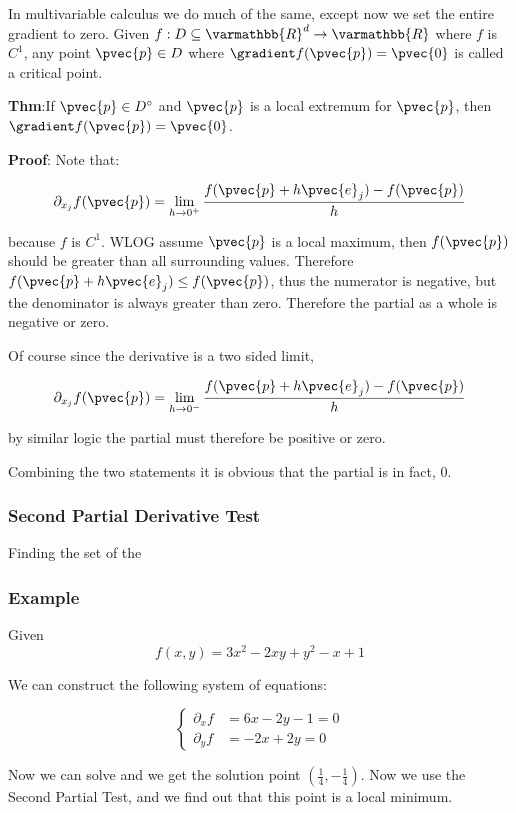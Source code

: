 \documentclass[11 pt, twoside]{article}
\begin{document}
In multivariable calculus we do much of the same, except now we set the entire
gradient to zero. Given $f: D \subseteq \varmathbb{R}^d \to \varmathbb{R}$ where
$f$ is $C^1$, any point $\pvec{p} \in D$ where $\gradient f(\pvec{p}) = \pvec{0}$
is called a critical point.

\textbf{Thm}:If $\pvec{p} \in D^\circ$ and $\pvec{p}$ is a local extremum for
$\pvec{p}$, then $\gradient f(\pvec{p}) = \pvec{0}$.

\textbf{Proof}: Note that:

$$\partial_{x_j} f(\pvec{p}) = \lim_{h \to 0^+} \frac{f(\pvec{p} +
h\pvec{e}_j) - f(\pvec{p})}{h}$$

because $f$ is $C^1$. WLOG assume $\pvec{p}$ is a local maximum, then
$f(\pvec{p})$ should be greater than all surrounding values. Therefore $f(\pvec{p}
+ h\pvec{e}_j) \leq f(\pvec{p})$, thus the numerator is negative, but the denominator
is always greater than zero. Therefore the partial as a whole is negative or
zero.

Of course since the derivative is a two sided limit, 

$$\partial_{x_j} f(\pvec{p}) = \lim_{h \to 0^-} \frac{f(\pvec{p} +
h\pvec{e}_j) - f(\pvec{p})}{h}$$

by similar logic the partial must therefore be positive or zero.

Combining the two statements it is obvious that the partial is in fact, 0.

\subsubsection{Second Partial Derivative Test}

Finding the set of the 

\subsubsection{Example}
Given 
$$f(x, y) = 3x^2 - 2xy + y^2 - x + 1$$

We can construct the following system of equations:

\[
\begin{cases}
\partial_x f &= 6x - 2y - 1 = 0\\
\partial_y f &= -2x + 2y = 0
\end{cases}
\]

Now we can solve and we get the solution point $(\frac{1}{4}, -\frac{1}{4})$.
Now we use the Second Partial Test, and we find out that this point is a local
minimum.
\end{document}

